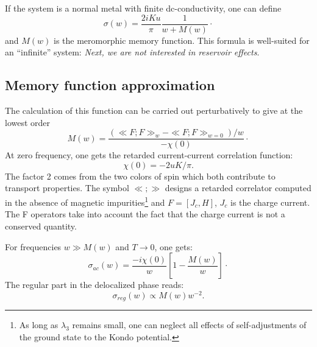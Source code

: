 If the system is a normal metal
with finite dc-conductivity, one can define\cite{Gotze-Wolfle}
\begin{equation}
\label{sigma}
\sigma(w)=\frac{2iK u}{\pi}\frac{1}{w+M(w)}\cdot
\end{equation}
and $M(w)$ is the meromorphic memory function. This formula
is well-suited for an ``infinite'' system: \emph{Next, 
we are not interested in reservoir effects}.

\subsection{Memory function approximation}

The calculation of
this function can be carried out perturbatively to give at the lowest order
\begin{equation}
\label{mf}
M(w)=\frac{(\ll F;F\gg_w-\ll F;F\gg_{w=0})/w}{-\chi(0)}\cdot
\end{equation}
At zero frequency, one gets the retarded current-current correlation function: 
\begin{equation}
\chi(0)=-2u K/\pi. 
\end{equation}
The factor 2 comes from the two colors of spin which both contribute
to transport properties.
The symbol $\ll;\gg$
designs a retarded correlator computed in the absence of magnetic 
impurities\footnote{As long as $\lambda_3$ remains small, one can neglect all effects of
self-adjustments of the ground state to the Kondo potential.}
and $F=[J_c,H]$, $J_c$ is the charge
 current. The F operators take into account the
fact that the charge
current is not a conserved quantity. 

For frequencies $w\gg M(w)$ and $T\rightarrow 0$, one gets:
\begin{equation}
\label{sigma-ac}
\sigma_{ac}(w)=\frac{-i\chi(0)}{w}[1-\frac{M(w)}{w}]\cdot
\end{equation}
The regular part in the delocalized phase reads:
\begin{equation}
\sigma_{reg}(w)\propto M(w)w^{-2}.
\end{equation}

